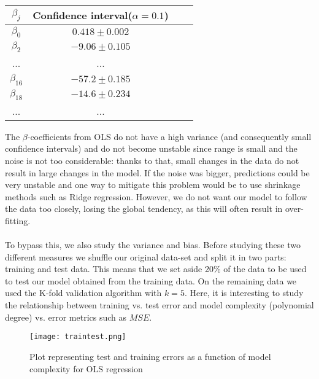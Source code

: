 \documentclass{emulateapj}
\begin{document}
\begin{center}
\begin{tabular}{ |c|c|c|c| } 
\hline
$\beta_j$ & Confidence interval($\alpha=0.1$) \\
\hline
$\beta_0$ & $0.418\pm0.002$\\
$\beta_2$ & $-9.06\pm0.105$\\
... & ...\\
$\beta_{16}$ & $-57.2\pm0.185$\\
$\beta_{18}$ & $-14.6\pm0.234$\\
... & ...\\
\hline
\end{tabular}
\end{center}
The $\beta$-coefficients from OLS do not have a high variance (and consequently small confidence intervals) and do not become unstable since range is small and the noise is not too considerable: thanks to that, small changes in the data do not result in large changes in the model. If the noise was bigger, predictions could be very unstable and one way to mitigate this problem would be to use shrinkage methods such as Ridge regression.
However, we do not want our model to follow the data too closely, losing the global tendency, as this will often result in over-fitting.  
\\
\\
To bypass this, we also study the variance and bias.
Before studying these two different measures we shuffle our original data-set and split it in two parts: training and test data. This means that we set aside 20\% of the data to be used to test our model obtained from the training data. On the remaining data we used the K-fold validation algorithm with $k=5$.
Here, it is interesting to study the relationship between training vs. test error and model complexity (polynomial degree) vs. error metrics such as $MSE$.
\\

\begin{figure}[H]
\caption{Plot representing test and training errors as a function of model complexity for OLS regression}
\centering
\texttt{[image: traintest.png]}
\label{test_training_OLS}
\end{figure}
\\
\end{document}
